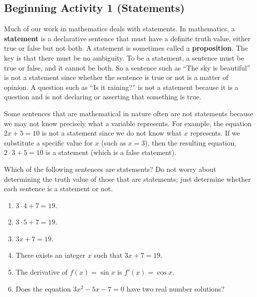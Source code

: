 %
\subsection{\textbf{Beginning Activity 1 (Statements)}} \label{PA:prop} \hfill
Much of our work in mathematics deals with statements.  In mathematics, a \textbf{statement}
\label{D:prop}%
%
  is a declarative sentence that must have a definite truth value, either true or false but not both.    
A statement is sometimes called a \textbf{proposition}.
%
The key is that there must be no ambiguity.  To be a statement, a sentence must be  true or false, and it cannot be both.  So a sentence such as ``The sky is beautiful'' is not a statement since whether the sentence is true or not is a matter of opinion.  A question such as ``Is it raining?'' is not a statement because it is a question and is not declaring or asserting that something is true.

Some sentences that are mathematical in nature often are not statements because we may not know precisely what a variable represents.  For example, the equation $2x + 5 = 10$ is not a statement since we do not know what $x$ represents.  If we substitute a specific value for $x$ (such as $x = 3$), then the resulting equation, $2 \cdot 3 + 5 = 10$ is a statement (which is a false statement). 


\noindent
Which of the following sentences are statements?  Do not worry about determining the truth value of those that are statements; just determine whether each sentence is a statement or not.
\begin{multicols}{2}
\begin{enumerate}
\item $3 \cdot 4 + 7 = 19$.
\item $3 \cdot 5 + 7 = 19$.
\item $3x + 7 = 19$.
\end{enumerate}
\end{multicols}
\begin{enumerate} \setcounter{enumi}{3}
  \item There exists an integer $x$ such that $3x + 7 = 19$.
\item The derivative of $f(x) = \sin x$ is $f'(x) = \cos x$.
\item Does the equation $3x^2 - 5x - 7 = 0$ have two real number solutions?
\end{enumerate}

